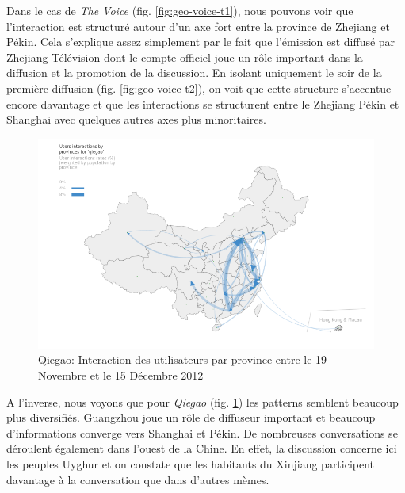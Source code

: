 Dans le cas de \textit{The Voice} (fig. \ref{fig:geo-voice-t1}), nous pouvons voir que l{\textquoteright}interaction est structur\'e autour d{\textquoteright}un axe fort entre la province de Zhejiang et P\'ekin. Cela s{\textquoteright}explique assez simplement par le fait que l{\textquoteright}\'emission est diffus\'e par Zhejiang T\'el\'evision dont le compte officiel joue un r\^ole important dans la diffusion et la promotion de la discussion. En isolant uniquement le soir de la premi\`ere diffusion (fig. \ref{fig:geo-voice-t2}), on voit que cette structure s{\textquoteright}accentue encore davantage et que les interactions se structurent entre le Zhejiang P\'ekin et Shanghai avec quelques autres axes plus minoritaires.

\begin{figure}[h!]
    \centering
    \includegraphics[scale=.35]{figures/chap4/chapitre4-img21.png}
    \caption{
      Qiegao: Interaction des utilisateurs par province entre le 19 Novembre et le 15 D\'ecembre 2012
    }
    \label{fig:geo-qiegao-t0}
\end{figure}

A l{\textquoteright}inverse, nous voyons que pour \textit{Qiegao} (fig. \ref{fig:geo-qiegao-t0}) les patterns semblent beaucoup plus diversifi\'es. Guangzhou joue un r\^ole de diffuseur important et beaucoup d{\textquoteright}informations converge vers Shanghai et P\'ekin. De nombreuses conversations se d\'eroulent \'egalement dans l{\textquoteright}ouest de la Chine. En effet, la discussion concerne ici les peuples Uyghur et on constate que les habitants du Xinjiang participent davantage \`a la conversation que dans d{\textquoteright}autres m\`emes.  




